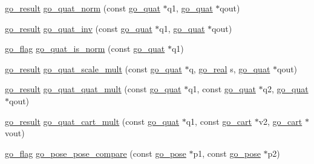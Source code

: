 \begin{DoxyCompactItemize}
\item 
\hyperlink{gotypes_8h_a55d48b38cd959f63c7e8db8337a9792a}{go\-\_\-result} \hyperlink{namespacegomotion_aa4e00f7f0a0c499da767458ac55269a3}{go\-\_\-quat\-\_\-norm} (const \hyperlink{structgomotion_1_1go__quat}{go\-\_\-quat} $\ast$q1, \hyperlink{structgomotion_1_1go__quat}{go\-\_\-quat} $\ast$qout)
\item 
\hyperlink{gotypes_8h_a55d48b38cd959f63c7e8db8337a9792a}{go\-\_\-result} \hyperlink{namespacegomotion_aa10a1f4ea91bf33c82fa1e687c35acaa}{go\-\_\-quat\-\_\-inv} (const \hyperlink{structgomotion_1_1go__quat}{go\-\_\-quat} $\ast$q1, \hyperlink{structgomotion_1_1go__quat}{go\-\_\-quat} $\ast$qout)
\item 
\hyperlink{gotypes_8h_ae890d9a0ddecc0d3073622cc4312092d}{go\-\_\-flag} \hyperlink{namespacegomotion_a0320bf206aa58e6f3587be2069704de8}{go\-\_\-quat\-\_\-is\-\_\-norm} (const \hyperlink{structgomotion_1_1go__quat}{go\-\_\-quat} $\ast$q1)
\item 
\hyperlink{gotypes_8h_a55d48b38cd959f63c7e8db8337a9792a}{go\-\_\-result} \hyperlink{namespacegomotion_a8ecc295000058285ea22d2f2c8bafb5a}{go\-\_\-quat\-\_\-scale\-\_\-mult} (const \hyperlink{structgomotion_1_1go__quat}{go\-\_\-quat} $\ast$q, \hyperlink{gotypes_8h_afd666a2393eebd71ee455846ac9def9b}{go\-\_\-real} s, \hyperlink{structgomotion_1_1go__quat}{go\-\_\-quat} $\ast$qout)
\item 
\hyperlink{gotypes_8h_a55d48b38cd959f63c7e8db8337a9792a}{go\-\_\-result} \hyperlink{namespacegomotion_ac32c196f6f682de23e5e828c601977a6}{go\-\_\-quat\-\_\-quat\-\_\-mult} (const \hyperlink{structgomotion_1_1go__quat}{go\-\_\-quat} $\ast$q1, const \hyperlink{structgomotion_1_1go__quat}{go\-\_\-quat} $\ast$q2, \hyperlink{structgomotion_1_1go__quat}{go\-\_\-quat} $\ast$qout)
\item 
\hyperlink{gotypes_8h_a55d48b38cd959f63c7e8db8337a9792a}{go\-\_\-result} \hyperlink{namespacegomotion_a7d60b7e9ba5faa7e59486698407dae20}{go\-\_\-quat\-\_\-cart\-\_\-mult} (const \hyperlink{structgomotion_1_1go__quat}{go\-\_\-quat} $\ast$q1, const \hyperlink{structgomotion_1_1go__cart}{go\-\_\-cart} $\ast$v2, \hyperlink{structgomotion_1_1go__cart}{go\-\_\-cart} $\ast$vout)
\item 
\hyperlink{gotypes_8h_ae890d9a0ddecc0d3073622cc4312092d}{go\-\_\-flag} \hyperlink{namespacegomotion_a3fb737a5f90354bd0809963797573769}{go\-\_\-pose\-\_\-pose\-\_\-compare} (const \hyperlink{structgomotion_1_1go__pose}{go\-\_\-pose} $\ast$p1, const \hyperlink{structgomotion_1_1go__pose}{go\-\_\-pose} $\ast$p2)
\item 

\end{DoxyCompactItemize}
